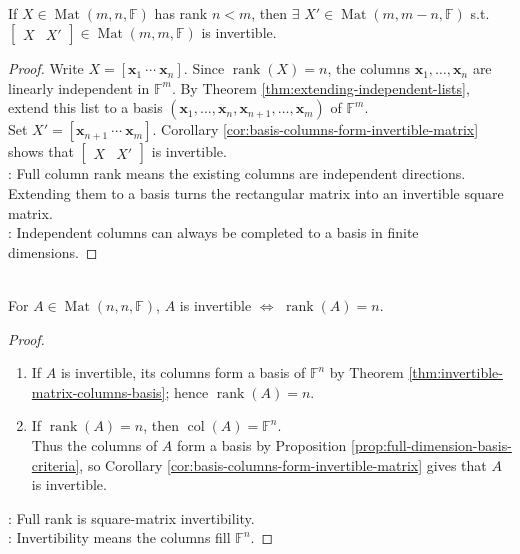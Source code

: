 \begin{theorem} \label{thm:complete-full-column-rank-matrix} \\
If $X\in\operatorname{Mat}(m,n,\mathbb{F})$ has rank $n<m$, then $\exists$ $X'\in\operatorname{Mat}(m,m-n,\mathbb{F})$ s.t. $\begin{bmatrix}X & X'\end{bmatrix}\in\operatorname{Mat}(m,m,\mathbb{F})$ is invertible.
\begin{proof}
Write $X=[\mathbf{x}_1\ \cdots\ \mathbf{x}_n]$. Since $\operatorname{rank}(X)=n$, the columns $\mathbf{x}_1,\ldots,\mathbf{x}_n$ are linearly independent in $\mathbb{F}^m$. By Theorem \ref{thm:extending-independent-lists}, extend this list to a basis $(\mathbf{x}_1,\ldots,\mathbf{x}_n,\mathbf{x}_{n+1},\ldots,\mathbf{x}_m)$ of $\mathbb{F}^m$.\\
Set $X'=[\mathbf{x}_{n+1}\ \cdots\ \mathbf{x}_m]$. Corollary \ref{cor:basis-columns-form-invertible-matrix} shows that $\begin{bmatrix}X & X'\end{bmatrix}$ is invertible.\\
: Full column rank means the existing columns are independent directions. Extending them to a basis turns the rectangular matrix into an invertible square matrix.\\
: Independent columns can always be completed to a basis in finite dimensions.
\end{proof}
\end{theorem}

\begin{corollary} \label{cor:square-matrix-invertible-iff-full-rank} \\
For $A\in\operatorname{Mat}(n,n,\mathbb{F})$, $A$ is invertible $\Longleftrightarrow$ $\operatorname{rank}(A)=n$.
\begin{proof}
\begin{enumerate}[label=\roman*.]
\setlength{\itemsep}{0pt}
\item[$(\Rightarrow)$] If $A$ is invertible, its columns form a basis of $\mathbb{F}^n$ by Theorem \ref{thm:invertible-matrix-columns-basis}; hence $\operatorname{rank}(A)=n$.
\item[$(\Leftarrow)$] If $\operatorname{rank}(A)=n$, then $\operatorname{col}(A)=\mathbb{F}^n$.\\
Thus the columns of $A$ form a basis by Proposition \ref{prop:full-dimension-basis-criteria}, so Corollary \ref{cor:basis-columns-form-invertible-matrix} gives that $A$ is invertible.
\end{enumerate}
: Full rank is square-matrix invertibility.\\
: Invertibility means the columns fill $\mathbb{F}^n$.
\end{proof}
\end{corollary}

